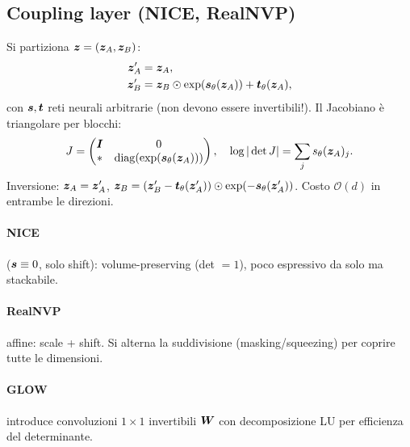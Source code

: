 \subsection{Coupling layer (NICE, RealNVP)}
Si partiziona $\bm{z} = (\bm{z}_A, \bm{z}_B)$:
\[
\begin{aligned}
\bm{z}'_A &= \bm{z}_A,\\
\bm{z}'_B &= \bm{z}_B \odot \exp(\bm{s}_\theta(\bm{z}_A)) + \bm{t}_\theta(\bm{z}_A),
\end{aligned}
\]
con $\bm{s}, \bm{t}$ reti neurali arbitrarie (non devono essere invertibili!). Il Jacobiano è triangolare per blocchi:
\[
J = \begin{pmatrix} \bm{I} & 0 \\ * & \mathrm{diag}(\exp(\bm{s}_\theta(\bm{z}_A))) \end{pmatrix},
\quad \log|\det J| = \sum_j s_\theta(\bm{z}_A)_j.
\]
Inversione: $\bm{z}_A = \bm{z}'_A$, $\bm{z}_B = (\bm{z}'_B - \bm{t}_\theta(\bm{z}'_A)) \odot \exp(-\bm{s}_\theta(\bm{z}'_A))$. Costo $\mathcal{O}(d)$ in entrambe le direzioni.

\paragraph{NICE} ($\bm{s} \equiv 0$, solo shift): volume-preserving (det $= 1$), poco espressivo da solo ma stackabile.

\paragraph{RealNVP} affine: scale + shift. Si alterna la suddivisione (masking/squeezing) per coprire tutte le dimensioni.

\paragraph{GLOW} introduce convoluzioni $1\times 1$ invertibili $\bm{W}$ con decomposizione LU per efficienza del determinante.

